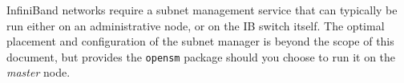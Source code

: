 \begin{center}
  \begin{tcolorbox}[]
InfiniBand networks require a subnet management service that can typically be run either
on an administrative node, or on the IB switch itself. The optimal placement and
configuration of the
subnet manager is beyond the scope of this document, but \baseOS{} provides the
\texttt{opensm} package should you choose to run it on the {\em master} node.
\end{tcolorbox}
\end{center}

